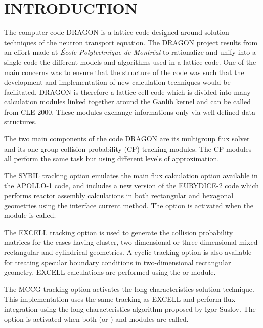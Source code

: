 \section{INTRODUCTION}\label{sect:Introduction}

The computer code DRAGON is a lattice code designed around solution techniques of 
the neutron transport equation.\cite{PIP2009} The DRAGON project results from an effort made at
{\sl \'Ecole Polytechnique de Montr\'eal} to rationalize and unify into a single code
the different models and algorithms used in a lattice code.\cite{Dragon1,Dragon2,Dragon3,Dragon4}
One of the main concerns was to ensure
that the structure of the code was such that the development and implementation
of new calculation techniques would be facilitated. DRAGON is therefore a
lattice cell code which is divided into many calculation modules linked together
around the Ganlib kernel and can be called from CLE-2000.\cite{ganlib5,cle2000} These modules exchange
informations only via well defined data structures.

The two main components of the code DRAGON are its multigroup flux solver and
its one-group collision probability (CP) tracking modules. The CP modules  all
perform the same task but using different levels of approximation.

The SYBIL tracking option emulates the main flux calculation option available in
the APOLLO-1 code,\cite{Apollo,SPH} and includes a new version of the
EURYDICE-2 code which performs reactor assembly calculations in both rectangular
and hexagonal geometries using the interface current method. The option
is activated when the  module is called.

The EXCELL tracking option is used to generate the collision probability
matrices for the cases having cluster, two-dimensional or three-dimensional
mixed rectangular and cylindrical geometries.\cite{DragonPIJI,Mtl93a} A cyclic
tracking option is also available for treating specular boundary conditions in
two-dimensional rectangular geometry.\cite{DragonPIJS1,Mtl93b} EXCELL
calculations are performed using the  or  module.

The MCCG tracking option activates the long characteristics solution technique.
This implementation uses the same tracking as EXCELL and perform flux
integration using the long characteristics algorithm proposed by Igor
Suslov.\cite{mccg,suslov2,chicago2} The option
is activated when both  (or ) and  modules are called.


